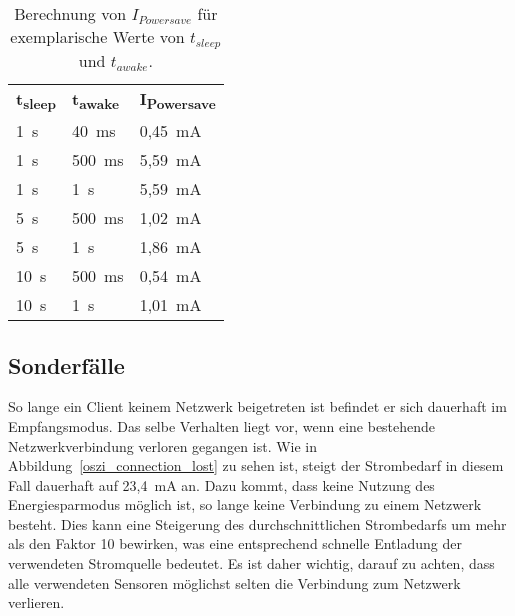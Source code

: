 \begin{table}
    \begin{center}
        \begin{tabular}{lll}
            \textbf{t\textsubscript{sleep}} & \textbf{t\textsubscript{awake}} & \textbf{I\textsubscript{Powersave}} \\
            1~s  & 40~ms  & 0,45~mA \\
            1~s  & 500~ms & 5,59~mA \\
            1~s  & 1~s    & 5,59~mA \\
            5~s  & 500~ms & 1,02~mA \\
            5~s  & 1~s    & 1,86~mA \\
            10~s & 500~ms & 0,54~mA \\
            10~s & 1~s    & 1,01~mA 
        \end{tabular}
    \end{center}
    \caption{Berechnung von $I_{Powersave}$ für exemplarische Werte von $t_{sleep}$ und $t_{awake}$.}
    \label{werte_Ipowersave}
\end{table}

\subsection{Sonderfälle}\label{leistungsaufnahme_sonderfaelle}
\Abbildungps{!htb}{0.75}{oszi/not_joined.jpg}{oszi_not_joined}{Client mit deaktiviertem Empfangsmodus.
    }
\Abbildungps{!htb}{0.75}{oszi/joined.jpg}{oszi_joined}{Beitrittsvorgang eines Clients in ein Netzwerk.
    }

So lange ein Client keinem Netzwerk beigetreten ist befindet er sich dauerhaft im Empfangsmodus. Das selbe Verhalten liegt
vor, wenn eine bestehende Netzwerkverbindung verloren gegangen ist. Wie in Abbildung~\ref{oszi_connection_lost} zu sehen
ist, steigt der Strombedarf in diesem Fall dauerhaft auf 23,4~mA an. Dazu kommt, dass keine Nutzung des Energiesparmodus
möglich ist, so lange keine Verbindung zu einem Netzwerk besteht. Dies kann eine Steigerung des durchschnittlichen
Strombedarfs um mehr als den Faktor 10 bewirken, was eine entsprechend schnelle Entladung der verwendeten Stromquelle bedeutet.
Es ist daher wichtig, darauf zu achten, dass alle verwendeten Sensoren möglichst selten die Verbindung zum 
Netzwerk verlieren.


